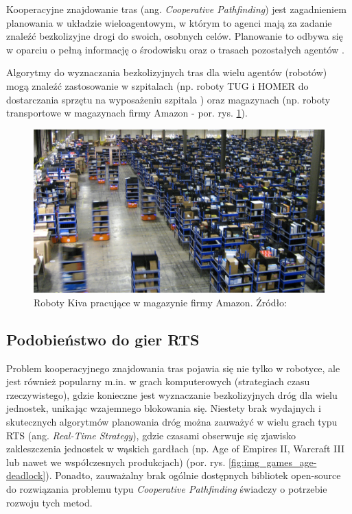 Kooperacyjne znajdowanie tras (ang. {\it Cooperative Pathfinding}) jest zagadnieniem planowania w układzie wieloagentowym, w którym to agenci mają za zadanie znaleźć bezkolizyjne drogi do swoich, osobnych celów. Planowanie to odbywa się w oparciu o pełną informację o środowisku oraz o trasach pozostałych agentów \cite{cooppath}.

Algorytmy do wyznaczania bezkolizyjnych tras dla wielu agentów (robotów) mogą znaleźć zastosowanie w szpitalach (np. roboty TUG i HOMER do dostarczania sprzętu na wyposażeniu szpitala \cite{tughomer}) oraz magazynach (np. roboty transportowe w magazynach firmy Amazon - por. rys. \ref{fig:image_kiva_amazon}).

\begin{figure}[H]
	\centering
	\includegraphics[width=14cm]{img/kiva-amazon}
	\caption{Roboty Kiva pracujące w magazynie firmy Amazon. Źródło: \cite{amazonkiva}}
	\label{fig:image_kiva_amazon}
\end{figure}

\subsection{Podobieństwo do gier RTS}
Problem kooperacyjnego znajdowania tras pojawia się nie tylko w robotyce, ale jest również popularny m.in. w grach komputerowych (strategiach czasu rzeczywistego), gdzie konieczne jest wyznaczanie bezkolizyjnych dróg dla wielu jednostek, unikając wzajemnego blokowania się. Niestety brak wydajnych i skutecznych algorytmów planowania dróg można zauważyć w wielu grach typu RTS (ang. {\it Real-Time Strategy}), gdzie czasami obserwuje się zjawisko zakleszczenia jednostek w wąskich gardłach (np. Age of Empires II, Warcraft III lub nawet we współczesnych produkcjach) \cite{efficient_coop_pathplanning} (por. rys. \ref{fig:img_games_age-deadlock}). Ponadto, zauważalny brak ogólnie dostępnych bibliotek open-source do rozwiązania problemu typu {\it Cooperative Pathfinding} świadczy o potrzebie rozwoju tych metod.

